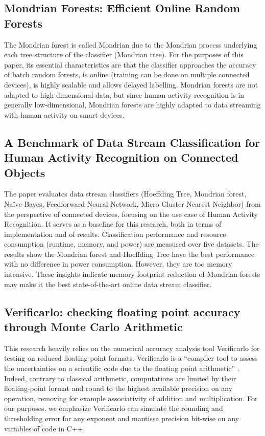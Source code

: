 \documentclass[conference]{IEEEtran}
\begin{document}
\subsection{Mondrian Forests: Efficient Online Random Forests}
The Mondrian forest is called Mondrian due to the Mondrian process underlying each tree structure of the classifier (Mondrian tree). For the purposes of this paper, its essential characteristics are that the classifier approaches the accuracy of batch random forests, is online (training can be done on multiple connected devices), is highly scalable and allows delayed labelling. \cite{b1} Mondrian forests are not adapted to high dimensional data, but since human activity recognition is in generally low-dimensional, Mondrian forests are highly adapted to data streaming with human activity on smart devices.
\subsection{A Benchmark of Data Stream Classification for Human Activity Recognition on Connected Objects}
The paper \cite{khannouz2020benchmark} evaluates data stream classifiers (Hoeffding Tree, Mondrian forest, Naïve Bayes, Feedforward Neural Network, Micro Cluster Nearest Neighbor) from the perspective of connected devices, focusing on the use case of Human Activity Recognition. It serves as a baseline for this research, both in terms of implementation and of results.  Classification performance and resource consumption (runtime, memory, and power) are measured over five datasets. The results show the Mondrian forest and Hoeffding Tree have the best performance with no difference in power consumption. However, they are too memory intensive. These insights indicate memory footprint reduction of Mondrian forests may make it the best state-of-the-art online data stream classifier.
\subsection{Verificarlo: checking floating point accuracy through Monte Carlo Arithmetic}
This research heavily relies on the numerical accuracy analysis tool Verificarlo for testing on reduced floating-point formats. Verificarlo is a “compiler tool to assess the uncertainties on a scientific code due to the floating point arithmetic” \cite{denis2016verificarlo}. Indeed, contrary to classical arithmetic, computations are limited by their floating-point format and round to the highest available precision on any operation, removing for example associativity of addition and multiplication. For our purposes, we emphasize Verificarlo can simulate the rounding and thresholding error for any exponent and mantissa precision bit-wise on any variables of code in C++.
\end{document}
